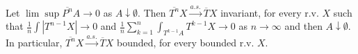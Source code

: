 Let $\lim \sup \overline{P^n} A \to 0$ as $A \downarrow \emptyset$. Then $\overline{T^n} X \xrightarrow{a.s.} \overline{T} X$ invariant, for every r.v. $X$ such that $\frac{1}{n} \int |T^{n-1} X| \to 0$ and $\frac{1}{n} \sum_{k=1}^{n} \int_{T^{k-1} A} T^{k-1} X \to 0$ as $n \to \infty$ and then $A \downarrow \emptyset$. In particular, $\overline{T^n} X \xrightarrow{a.s.} \overline{T} X$ bounded, for every bounded r.v. $X$.
